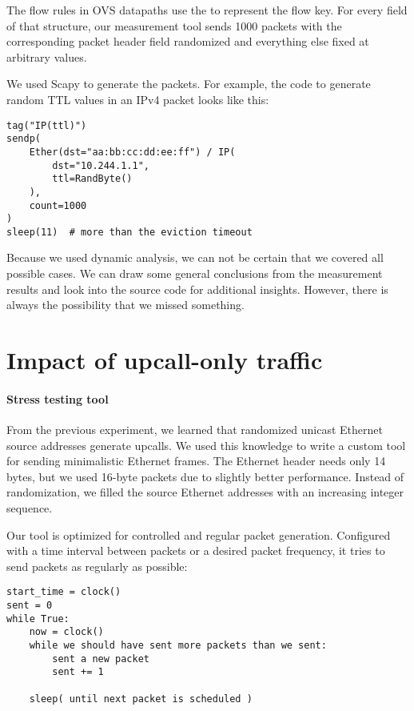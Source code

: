 The flow rules in OVS datapaths use the \href{https://elixir.bootlin.com/linux/v6.2.15/source/net/openvswitch/flow.h\#L75}{} to represent the flow key. For every field of that structure, our measurement tool sends 1000 packets with the corresponding packet header field randomized and everything else fixed at arbitrary values.

We used Scapy to generate the packets. For example, the code to generate random TTL values in an IPv4 packet looks like this:


\pagebreak  %
\begin{verbatim}
tag("IP(ttl)")
sendp(
    Ether(dst="aa:bb:cc:dd:ee:ff") / IP(
        dst="10.244.1.1",
        ttl=RandByte()
    ),
    count=1000
)
sleep(11)  # more than the eviction timeout
\end{verbatim}

Because we used dynamic analysis, we can not be certain that we covered all possible cases. We can draw some general conclusions from the measurement results and look into the source code for additional insights. However, there is always the possibility that we missed something.

\section{Impact of upcall-only traffic}
\label{design:upcall-impact}

\paragraph{Stress testing tool}
From the previous experiment, we learned that randomized unicast Ethernet source addresses generate upcalls. We used this knowledge to write a custom tool for sending minimalistic Ethernet frames. The Ethernet header needs only 14 bytes, but we used 16-byte packets due to slightly better performance. Instead of randomization, we filled the source Ethernet addresses with an increasing integer sequence.

Our tool is optimized for controlled and regular packet generation. Configured with a time interval between packets or a desired packet frequency, it tries to send packets as regularly as possible:

\begin{verbatim}
start_time = clock()
sent = 0
while True:
    now = clock()
    while we should have sent more packets than we sent:
        sent a new packet
        sent += 1
    
    sleep( until next packet is scheduled )
\end{verbatim}

